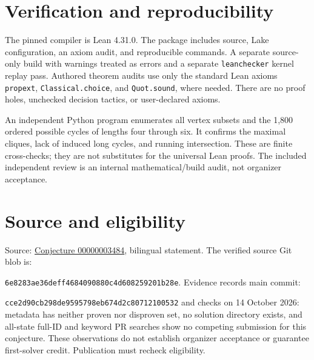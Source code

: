 \documentclass[11pt]{article}
\begin{document}
\section{Verification and reproducibility}
The pinned compiler is Lean 4.31.0. The package includes source, Lake configuration, an axiom audit, and reproducible commands. A separate source-only build with warnings treated as errors and a separate \texttt{leanchecker} kernel replay pass. Authored theorem audits use only the standard Lean axioms \texttt{propext}, \texttt{Classical.choice}, and \texttt{Quot.sound}, where needed. There are no proof holes, unchecked decision tactics, or user-declared axioms.

An independent Python program enumerates all vertex subsets and the 1,800 ordered possible cycles of lengths four through six. It confirms the maximal cliques, lack of induced long cycles, and running intersection. These are finite cross-checks; they are not substitutes for the universal Lean proofs. The included independent review is an internal mathematical/build audit, not organizer acceptance.

\section*{Source and eligibility}
Source: \href{https://github.com/The-Last-Math-Competition/The-Last-Math-Competition/blob/main/conjectures/00000003484.md}{Conjecture 00000003484}, bilingual statement. The verified source Git blob is:\par\noindent\texttt{6e8283ae36deff4684090880c4d608259201b28e}. Evidence records main commit:\par\noindent\texttt{cce2d90cb298de9595798eb674d2c80712100532} and checks on 14 October 2026: metadata has neither proven nor disproven set, no solution directory exists, and all-state full-ID and keyword PR searches show no competing submission for this conjecture. These observations do not establish organizer acceptance or guarantee first-solver credit. Publication must recheck eligibility.
\end{document}
